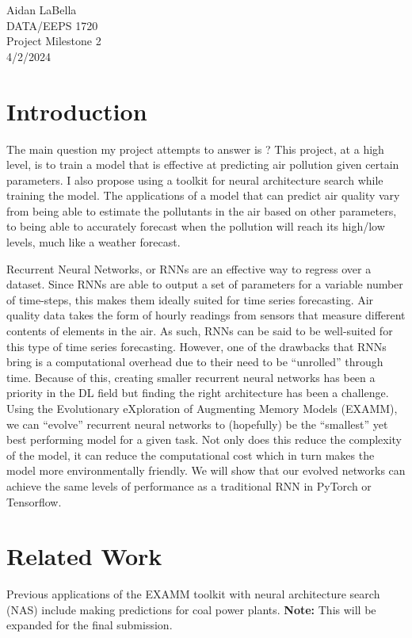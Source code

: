 \documentclass[12pt]{article}
\begin{document}
\noindent
Aidan LaBella \\
DATA/EEPS 1720 \\
Project Milestone 2\\
4/2/2024 \\

\section{Introduction}
The main question my project attempts to answer is ? This project, at a high level, is to train a model that is effective at predicting air pollution given certain parameters. I also propose using a toolkit for neural architecture search while training the model. The applications of a model that can predict air quality vary from being able to estimate the pollutants in the air based on other parameters, to being able to accurately forecast when the pollution will reach its high/low levels, much like a weather forecast. 

Recurrent Neural Networks, or RNNs are an effective way to regress over a dataset. Since RNNs are able to output a set of parameters for a variable number of time-steps, this makes them ideally suited for time series forecasting. Air quality data takes the form of hourly readings from sensors that measure different contents of elements in the air. As such, RNNs can be said to be well-suited for this type of time series forecasting. However, one of the drawbacks that RNNs bring is a computational overhead due to their need to be “unrolled” through time. Because of this, creating smaller recurrent neural networks has been a priority in the DL field but finding the right architecture has been a challenge. Using the Evolutionary eXploration of Augmenting Memory Models (EXAMM)\cite{ororbia_investigating_2019}, we can “evolve'' recurrent neural networks to (hopefully) be the “smallest” yet best performing model for a given task. Not only does this reduce the complexity of the model, it can reduce the computational cost which in turn makes the model more environmentally friendly. We will show that our evolved networks can achieve the same levels of performance as a traditional RNN in PyTorch or Tensorflow.

\section{Related Work}
Previous applications of the EXAMM\cite{ororbia_investigating_2019} toolkit with neural architecture search (NAS) include making predictions for coal power plants\cite{kaufmann_evolving_2019}.
\textbf{Note:} This will be expanded for the final submission.
\end{document}

